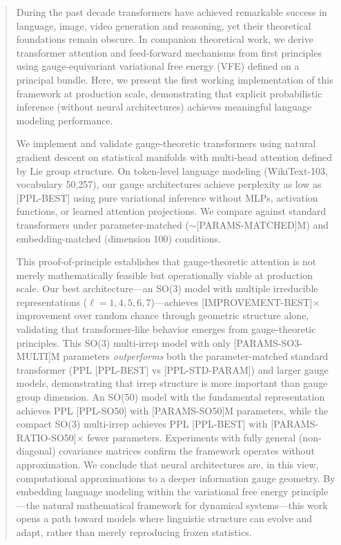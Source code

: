 \documentclass[twoside,11pt]{article}
\begin{document}
\begin{abstract}
During the past decade transformers have achieved remarkable success in language, image, video generation and reasoning, yet their theoretical foundations remain obscure. In companion theoretical work, we derive transformer attention and feed-forward mechanisms from first principles using gauge-equivariant variational free energy (VFE) defined on a principal bundle. Here, we present the first working implementation of this framework at production scale, demonstrating that explicit probabilistic inference (without neural architectures) achieves meaningful language modeling performance.

We implement and validate gauge-theoretic transformers using natural gradient descent on statistical manifolds with multi-head attention defined by Lie group structure. On token-level language modeling (WikiText-103, vocabulary 50,257), our gauge architectures achieve perplexity as low as [PPL-BEST] using pure variational inference without MLPs, activation functions, or learned attention projections. We compare against standard transformers under parameter-matched ($\sim$[PARAMS-MATCHED]M) and embedding-matched (dimension 100) conditions.

This proof-of-principle establishes that gauge-theoretic attention is not merely mathematically feasible but operationally viable at production scale. Our best architecture---an SO(3) model with multiple irreducible representations ($\ell=1,4,5,6,7$)---achieves [IMPROVEMENT-BEST]$\times$ improvement over random chance through geometric structure alone, validating that transformer-like behavior emerges from gauge-theoretic principles. This SO(3) multi-irrep model with only [PARAMS-SO3-MULTI]M parameters \emph{outperforms} both the parameter-matched standard transformer (PPL [PPL-BEST] vs [PPL-STD-PARAM]) and larger gauge models, demonstrating that irrep structure is more important than gauge group dimension. An SO(50) model with the fundamental representation achieves PPL [PPL-SO50] with [PARAMS-SO50]M parameters, while the compact SO(3) multi-irrep achieves PPL [PPL-BEST] with [PARAMS-RATIO-SO50]$\times$ fewer parameters. Experiments with fully general (non-diagonal) covariance matrices confirm the framework operates without approximation. We conclude that neural architectures are, in this view, computational approximations to a deeper information gauge geometry. By embedding language modeling within the variational free energy principle---the natural mathematical framework for dynamical systems---this work opens a path toward models where linguistic structure can evolve and adapt, rather than merely reproducing frozen statistics.
\end{abstract}
\end{document}
